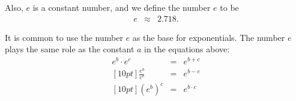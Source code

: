 Also, $e$ is a constant number, and we define the number $e$ to be 
\begin{eqnarray*}
  e & \approx & 2.718.
\end{eqnarray*}

It is common to use the number $e$ as the base for exponentials. The
number $e$ plays the same role as the constant $a$ in the equations
above:
\begin{eqnarray}
  e^b \cdot e^c & = & e^{b+c}   \\ [10pt]
  \frac{e^b}{e^c} & = & e^{b-c} \\  [10pt]
  \left( e^b \right)^c & = & e^{b\cdot c}
\end{eqnarray}



